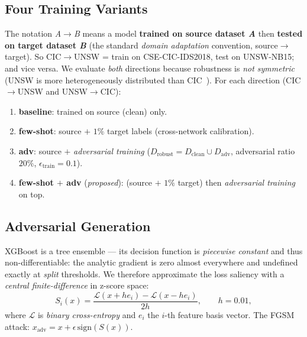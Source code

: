 \documentclass[preprint,12pt,authoryear]{elsarticle}
\begin{document}
\subsection{Four Training Variants}
The notation \emph{A}$\rightarrow$\emph{B} means a model \textbf{trained on source
dataset \emph{A}} then \textbf{tested on target dataset \emph{B}} (the standard
\emph{domain adaptation} convention, source$\rightarrow$target). So CIC$\rightarrow$UNSW
= train on CSE-CIC-IDS2018, test on UNSW-NB15; and vice versa. We evaluate
\emph{both} directions because robustness is \emph{not symmetric} (UNSW is more
heterogeneously distributed than CIC~\citep{martono2024sfm}). For each direction
(CIC$\rightarrow$UNSW and UNSW$\rightarrow$CIC):
\begin{enumerate}
  \item \textbf{baseline}: trained on source (clean) only.
  \item \textbf{few-shot}: source $+$ $1\%$ target labels (cross-network calibration).
  \item \textbf{adv}: source $+$ \emph{adversarial training}
  ($D_{\text{robust}} = D_{\text{clean}} \cup D_{\text{adv}}$, adversarial ratio
  $20\%$, $\epsilon_{\text{train}}=0.1$).
  \item \textbf{few-shot $+$ adv} (\emph{proposed}): (source $+$ $1\%$ target) then
  \emph{adversarial training} on top.
\end{enumerate}

\subsection{Adversarial Generation}
\label{sec:saliency}
XGBoost is a tree ensemble --- its decision function is \emph{piecewise constant}
and thus non-differentiable: the analytic gradient is zero almost everywhere and
undefined exactly at \emph{split} thresholds. We therefore approximate the loss
saliency with a \emph{central finite-difference} in z-score space:
\begin{equation}
S_i(x) = \frac{\mathcal{L}(x + h e_i) - \mathcal{L}(x - h e_i)}{2h}, \qquad h=0.01,
\end{equation}
where $\mathcal{L}$ is \emph{binary cross-entropy} and $e_i$ the $i$-th feature
basis vector. The FGSM attack: $x_{\text{adv}} = x + \epsilon\,\mathrm{sign}(S(x))$.
\end{document}
